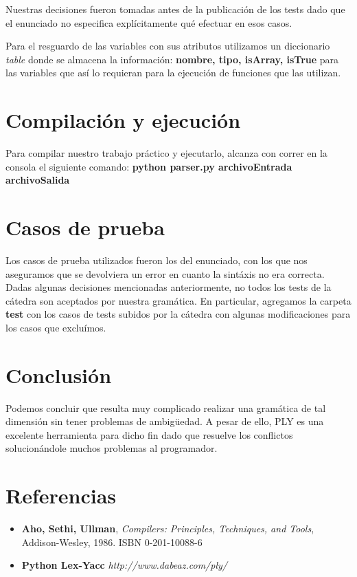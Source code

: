 \documentclass[10pt,a4paper]{article}
\begin{document}
Nuestras decisiones fueron tomadas antes de la publicación de los tests dado que el enunciado no especifica explícitamente qué efectuar en esos casos.

Para el resguardo de las variables con sus atributos utilizamos un diccionario \textit{table} donde se almacena la información: \textbf{nombre, tipo, isArray, isTrue} para las variables que así lo requieran para la ejecución de funciones que las utilizan.

\section{Compilación y ejecución}
Para compilar nuestro trabajo práctico y ejecutarlo, alcanza con correr en la consola el siguiente comando:
\textbf{python parser.py archivoEntrada archivoSalida}

\section{Casos de prueba}
Los casos de prueba utilizados fueron los del enunciado, con los que nos aseguramos que se devolviera un error en cuanto la sintáxis no era correcta. Dadas algunas decisiones mencionadas anteriormente, no todos los tests de la cátedra son aceptados por nuestra gramática. En particular, agregamos la carpeta \textbf{test} con los casos de tests subidos por la cátedra con algunas modificaciones para los casos que excluímos.

\section{Conclusión}
Podemos concluir que resulta muy complicado realizar una gramática de tal dimensión sin tener problemas de ambigüedad. A pesar de ello, PLY es una excelente herramienta para dicho fin dado que resuelve los conflictos solucionándole muchos problemas al programador.

\section{Referencias}
\begin{itemize}
\item \textbf{Aho, Sethi, Ullman}, \textit{Compilers: Principles, Techniques, and Tools}, Addison-Wesley, 1986. ISBN 0-201-10088-6

\item \textbf{Python Lex-Yacc} \textit{http://www.dabeaz.com/ply/}
\end{itemize}
\end{document}
